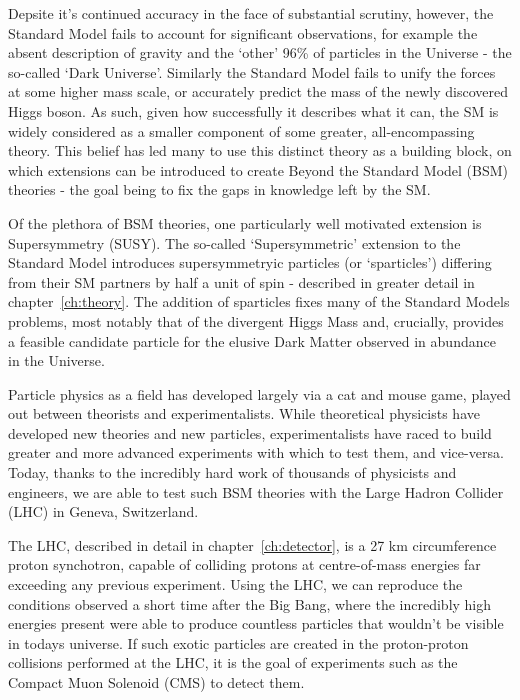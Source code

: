 Depsite it's continued accuracy in the face of substantial scrutiny, however,
the Standard Model fails to account for significant observations, for example
the absent description of gravity and the `other' 96\% of particles in the
Universe - the so-called `Dark Universe'. Similarly the Standard Model fails to
unify the forces at some higher mass scale, or accurately predict the mass of
the newly
discovered Higgs boson. As such, given how successfully it describes what it
can, the SM is widely considered
as a smaller component of some greater, all-encompassing theory.
This belief has led many to use this distinct theory as a building
block, on which extensions can be introduced to create Beyond the Standard Model
(BSM) theories - the goal being to fix the gaps in knowledge left by the SM.

Of the plethora of BSM theories, one particularly well motivated extension is
Supersymmetry (SUSY). The so-called `Supersymmetric' extension to the Standard
Model introduces supersymmetryic particles (or `sparticles') differing from
their SM partners by half a unit of spin - described in greater detail in
chapter~\ref{ch:theory}. The addition of sparticles fixes
many of the Standard Models problems, most notably that of the
divergent Higgs Mass and, crucially, provides a feasible
candidate particle for the elusive Dark Matter observed in abundance in the
Universe.

Particle physics as a field has developed largely via a cat and mouse game,
played out between theorists and experimentalists. While theoretical physicists
have
developed new theories and new particles, experimentalists have raced to build
greater and more advanced experiments with which to test them, and vice-versa.
Today, thanks to the incredibly hard work of thousands of physicists and
engineers, we are able to test such BSM theories with the Large
Hadron Collider (LHC) in Geneva, Switzerland.

The LHC, described in detail in chapter~\ref{ch:detector}, is a 27 km
circumference proton synchotron, capable of colliding protons
at centre-of-mass energies far exceeding any previous experiment.
Using the LHC, we can reproduce the conditions observed a short time
after the Big Bang, where the incredibly high energies present were able to
produce countless particles that wouldn't be visible in todays universe. If
such exotic particles are created in the proton-proton collisions performed at
the LHC, it is the goal of experiments such as the Compact Muon Solenoid (CMS)
to detect them.

